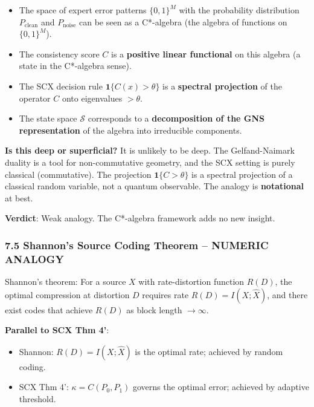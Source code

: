 \documentclass[
  12pt,
]{ctexart}
\providecommand{\tightlist}{%
  \setlength{\itemsep}{0pt}\setlength{\parskip}{0pt}}
\begin{document}
\begin{itemize}
\tightlist
\item
  The space of expert error patterns \(\{0,1\}^M\) with the probability
  distribution \(P_{\text{clean}}\) and \(P_{\text{noise}}\) can be seen
  as a C*-algebra (the algebra of functions on \(\{0,1\}^M\)).
\item
  The consistency score \(C\) is a \textbf{positive linear functional}
  on this algebra (a state in the C*-algebra sense).
\item
  The SCX decision rule \(\mathbf{1}\{C(x) > \theta\}\) is a
  \textbf{spectral projection} of the operator \(C\) onto eigenvalues
  \(> \theta\).
\item
  The state space \(\mathcal{S}\) corresponds to a \textbf{decomposition
  of the GNS representation} of the algebra into irreducible components.
\end{itemize}

\textbf{Is this deep or superficial?} It is unlikely to be deep. The
Gelfand-Naimark duality is a tool for non-commutative geometry, and the
SCX setting is purely classical (commutative). The projection
\(\mathbf{1}\{C > \theta\}\) is a spectral projection of a classical
random variable, not a quantum observable. The analogy is
\textbf{notational} at best.

\textbf{Verdict}: Weak analogy. The C*-algebra framework adds no new
insight.

\subsubsection{7.5 Shannon's Source Coding Theorem -- NUMERIC
ANALOGY}\label{shannons-source-coding-theorem-numeric-analogy}

Shannon's theorem: For a source \(X\) with rate-distortion function
\(R(D)\), the optimal compression at distortion \(D\) requires rate
\(R(D) = I(X; \hat{X})\), and there exist codes that achieve \(R(D)\) as
block length \(\to \infty\).

\textbf{Parallel to SCX Thm 4'}:

\begin{itemize}
\tightlist
\item
  Shannon: \(R(D) = I(X; \hat{X})\) is the optimal rate; achieved by
  random coding.
\item
  SCX Thm 4': \(\kappa = C(P_0, P_1)\) governs the optimal error;
  achieved by adaptive threshold.
\end{itemize}
\end{document}
